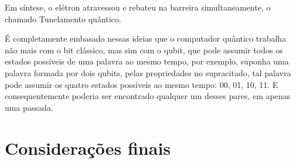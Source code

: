 \documentclass[
	12pt,				%
	oneside,			%
	a4paper,			%
	english,			%
	french,				%
	spanish,			%
	brazil,				%
	]{abntex2}
\begin{document}
Em síntese, o elétron atravessou e rebateu na barreira simultaneamente, o chamado Tunelamento quântico.

É completamente embasado nessas ideias que o computador quântico trabalha não mais com o bit clássico, mas sim com o qubit, que pode assumir todos os estados possíveis de uma palavra ao mesmo tempo, por exemplo, suponha uma palavra formada por dois qubits, pelas propriedades no supracitado, tal palavra pode assumir os quatro estados possíveis ao mesmo tempo: 00, 01, 10, 11. E consequentemente poderia ser encontrado qualquer um desses pares, em apenas uma passada.




\chapter*[Considerações finais]{Considerações finais}

\lipsum[31-33]

\postextual





\printindex
\end{document}
